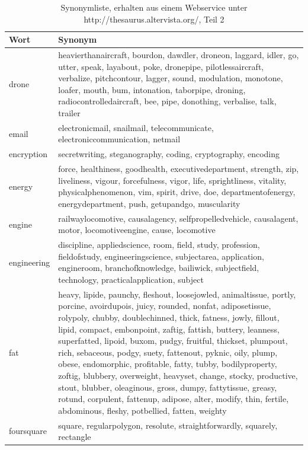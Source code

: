 \documentclass[12pt,a4paper]{report}
\begin{document}
	\begin{table}[H]
\caption{Synonymliste, erhalten aus einem Webservice unter http://thesaurus.altervista.org/, Teil 2 }
\begin{center}
\begin{tabular}{ |l|p{13cm}|}
\hline
\textbf{Wort} & \textbf{Synonym}\\
\hline
drone & heavierthanaircraft, bourdon, dawdler, droneon, laggard, idler, go, utter, speak, layabout, poke, dronepipe, pilotlessaircraft, verbalize, pitchcontour, lagger, sound, modulation, monotone, loafer, mouth, bum, intonation, taborpipe, droning, radiocontrolledaircraft, bee, pipe, donothing, verbalise, talk, trailer\\
\hline
email & electronicmail, snailmail, telecommunicate, electroniccommunication, netmail\\
\hline
encryption & secretwriting, steganography, coding, cryptography, encoding\\
\hline
energy & force, healthiness, goodhealth, executivedepartment, strength, zip, liveliness, vigour, forcefulness, vigor, life, sprightliness, vitality, physicalphenomenon, vim, spirit, drive, doe, departmentofenergy, energydepartment, push, getupandgo, muscularity\\
\hline
engine & railwaylocomotive, causalagency, selfpropelledvehicle, causalagent, motor, locomotiveengine, cause, locomotive\\
\hline
engineering & discipline, appliedscience, room, field, study, profession, fieldofstudy, engineeringscience, subjectarea, application, engineroom, branchofknowledge, bailiwick, subjectfield, technology, practicalapplication, subject\\
\hline
fat & heavy, lipide, paunchy, fleshout, loosejowled, animaltissue, portly, porcine, avoirdupois, juicy, rounded, nonfat, adiposetissue, rolypoly, chubby, doublechinned, thick, fatness, jowly, fillout, lipid, compact, embonpoint, zaftig, fattish, buttery, leanness, superfatted, lipoid, buxom, pudgy, fruitful, thickset, plumpout, rich, sebaceous, podgy, suety, fattenout, pyknic, oily, plump, obese, endomorphic, profitable, fatty, tubby, bodilyproperty, zoftig, blubbery, overweight, heavyset, change, stocky, productive, stout, blubber, oleaginous, gross, dumpy, fattytissue, greasy, rotund, corpulent, fattenup, adipose, alter, modify, thin, fertile, abdominous, fleshy, potbellied, fatten, weighty\\
\hline
foursquare & square, regularpolygon, resolute, straightforwardly, squarely, rectangle\\

\end{tabular}
\end{center}
\end{table}
\end{document}
